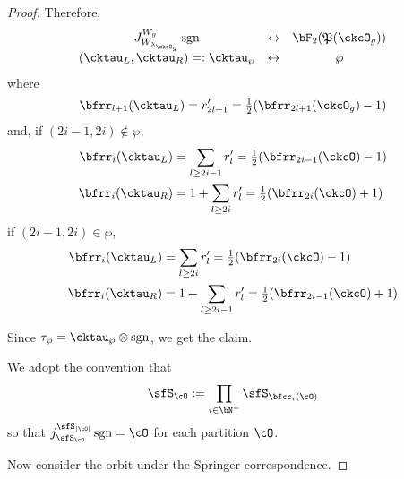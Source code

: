 \documentclass[12pt,a4paper]{amsart}
\def\abs#1{\left|{#1}\right|}
\newcommand{\sgn}{\operatorname{sgn}}
\numberwithin{equation}{section}
\theoremstyle{remark}
\def\half{{\tfrac{1}{2}}}
\def\lamckg{\lambda_{\ckcO_g}}
\def\CPP{\mathfrak{P}}
\begin{document}
\begin{proof}
{      Therefore,
      \[
        \begin{array}{ccc}
          J_{W_{\lamckg}}^{W_{g}} \sgn
          &\leftrightarrow&  \bF_{2}(\CPP(\ckcO_{g}))\\
          (\cktau_{L},\cktau_{R}) =:\cktau_{\wp}&\leftrightarrow & \wp
        \end{array}
      \]
      where
      \[
        \bfrr_{l+1}(\cktau_{L}) = r'_{2l+1} = \half (\bfrr_{2l+1}(\ckcO_{g})-1)
      \]
      and, if $(2i-1,2i)\notin \wp$,
      \[
        \begin{split}
          \bfrr_{i}(\cktau_{L}) & = \sum_{l\geq 2i-1} r'_{l}
          = \half(\bfrr_{2i-1}(\ckcO)-1)\\
          \bfrr_{i}(\cktau_{R}) & = 1 + \sum_{l\geq 2i} r'_{l} = \half(\bfrr_{2i}(\ckcO)+1)
        \end{split}
      \]
      if $(2i-1,2i)\in \wp$,
      \[
        \begin{split}
          \bfrr_{i}(\cktau_{L}) & = \sum_{l\geq 2i} r'_{l}
          = \half(\bfrr_{2i}(\ckcO)-1)\\
          \bfrr_{i}(\cktau_{R}) & = 1 + \sum_{l\geq 2i-1} r'_{l} = \half(\bfrr_{2i-1}(\ckcO)+1)
        \end{split}
      \]


      Since $\tau_{\wp} = \cktau_{\wp}\otimes \sgn$, we get the claim.

      We adopt the convention that
      \[
        \sfS_{\cO} := \prod_{i\in \bN^{+}}\sfS_{\bfcc_{i}(\cO)}
      \]
      so that $j_{\sfS_{\cO}}^{\sfS_{\abs{\cO}}}\sgn = \cO$ for each partition
      $\cO$.

      Now consider the orbit under the Springer correspondence.

}
\end{proof}
\end{document}
